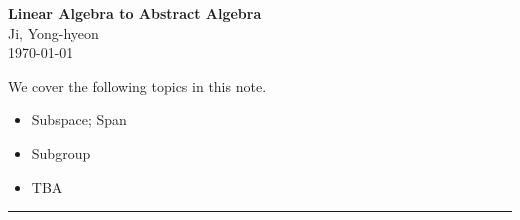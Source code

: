\documentclass[11pt,openany]{article}
\begin{document}
\begin{center}
	\huge\textbf{Linear Algebra to Abstract Algebra}\\
	\vspace{0.5em}
	\large{Ji, Yong-hyeon}\\
	\vspace{0.5em}
	\normalsize{\today}\\
\end{center}

\noindent 
We cover the following topics in this note.
\begin{itemize}
	\item Subspace; Span
	\item Subgroup
	\item TBA
\end{itemize}
\hrule\vspace{12pt}
\end{document}
